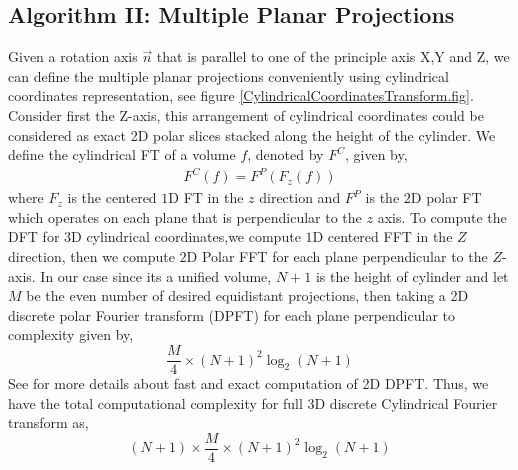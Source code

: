 \documentclass{UCF_ETD}
\begin{document}
\subsection{Algorithm II: Multiple Planar Projections}
Given a rotation axis $\vec{n}$ that is parallel to one of the principle axis X,Y and Z, we can define the multiple planar projections conveniently using cylindrical coordinates representation, see figure \ref{CylindricalCoordinatesTransform.fig}. Consider first the Z-axis, this arrangement of cylindrical coordinates could be considered as exact 2D polar slices stacked along the height of the cylinder. We define the cylindrical FT of a volume $f$, denoted by $F^C$, given by,
\begin{eqnarray}\label{CylindricalFourierTransform}
F^C(f) = F^P(F_z(f))
\end{eqnarray}
where $F_z$ is the centered $1$D FT in the $z$ direction and $F^P$ is the $2$D polar FT which operates on each plane that is perpendicular to the $z$ axis. To compute the DFT for $3$D cylindrical coordinates,we compute $1$D centered FFT in the $Z$ direction, then we compute $2$D Polar FFT for each plane perpendicular to the $Z$-axis. In our case since its a unified volume, $N+1$ is the height of cylinder and let $M$ be the even number of desired equidistant projections, then taking a 2D discrete polar Fourier transform (DPFT) for each plane perpendicular to  complexity given by,
\begin{equation}\label{2DComplexityFVR}
\frac{M}{4} \times (N+1)^2 \log_2(N+1)
\end{equation}
See \cite{Alam2015} for more details about fast and exact computation of 2D DPFT. Thus, we have the total computational complexity for full 3D discrete Cylindrical Fourier transform as, 
\begin{equation}\label{3DComplexityFVR}
(N+1) \times \frac{M}{4} \times (N+1)^2 \log_2(N+1)
\end{equation}
\end{document}
